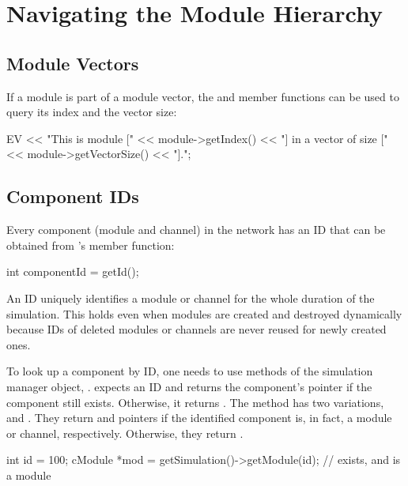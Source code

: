 \section{Navigating the Module Hierarchy}
\label{sec:simple-modules:walking-module-hierarchy}

\subsection{Module Vectors}
\label{sec:simple-modules:module-vectors}

If a module is part of a module vector, the
 and  member functions can be used to
query its index and the vector size:

\begin{cpp}
EV << "This is module [" << module->getIndex() <<
      "] in a vector of size [" << module->getVectorSize() << "].\n";
\end{cpp}


\subsection{Component IDs}
\label{sec:simple-modules:module-ids}

Every component (module and channel) in the network has an ID that
can be obtained from 's  member
function:

\begin{cpp}
int componentId = getId();
\end{cpp}

An ID uniquely identifies a module or channel for the whole duration of the
simulation. This holds even when modules are created and destroyed
dynamically because IDs of deleted modules or channels are never reused for
newly created ones.

To look up a component by ID, one needs to use methods of the simulation
manager object, .  expects an ID and
returns the component's pointer if the component still exists. Otherwise, it
returns . The method has two variations, 
and . They return  and 
pointers if the identified component is, in fact, a module or channel, respectively.
Otherwise, they return .

\begin{cpp}
int id = 100;
cModule *mod = getSimulation()->getModule(id); // exists, and is a module
\end{cpp}


